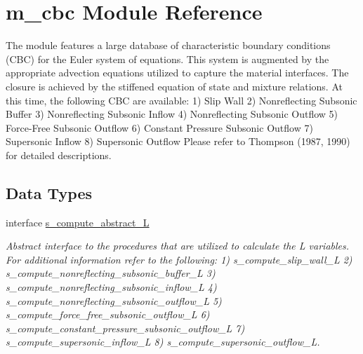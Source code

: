 \hypertarget{namespacem__cbc}{}\section{m\+\_\+cbc Module Reference}
\label{namespacem__cbc}


The module features a large database of characteristic boundary conditions (C\+BC) for the Euler system of equations. This system is augmented by the appropriate advection equations utilized to capture the material interfaces. The closure is achieved by the stiffened equation of state and mixture relations. At this time, the following C\+BC are available\+: 1) Slip Wall 2) Nonreflecting Subsonic Buffer 3) Nonreflecting Subsonic Inflow 4) Nonreflecting Subsonic Outflow 5) Force-\/\+Free Subsonic Outflow 6) Constant Pressure Subsonic Outflow 7) Supersonic Inflow 8) Supersonic Outflow Please refer to Thompson (1987, 1990) for detailed descriptions.  


\subsection*{Data Types}
\begin{DoxyCompactItemize}
\item 
interface \hyperlink{interfacem__cbc_1_1s__compute__abstract___l}{s\+\_\+compute\+\_\+abstract\+\_\+L}
\begin{DoxyCompactList}\small\item\em Abstract interface to the procedures that are utilized to calculate the L variables. For additional information refer to the following\+: 1) s\+\_\+compute\+\_\+slip\+\_\+wall\+\_\+L 2) s\+\_\+compute\+\_\+nonreflecting\+\_\+subsonic\+\_\+buffer\+\_\+L 3) s\+\_\+compute\+\_\+nonreflecting\+\_\+subsonic\+\_\+inflow\+\_\+L 4) s\+\_\+compute\+\_\+nonreflecting\+\_\+subsonic\+\_\+outflow\+\_\+L 5) s\+\_\+compute\+\_\+force\+\_\+free\+\_\+subsonic\+\_\+outflow\+\_\+L 6) s\+\_\+compute\+\_\+constant\+\_\+pressure\+\_\+subsonic\+\_\+outflow\+\_\+L 7) s\+\_\+compute\+\_\+supersonic\+\_\+inflow\+\_\+L 8) s\+\_\+compute\+\_\+supersonic\+\_\+outflow\+\_\+L. \end{DoxyCompactList}\end{DoxyCompactItemize}
